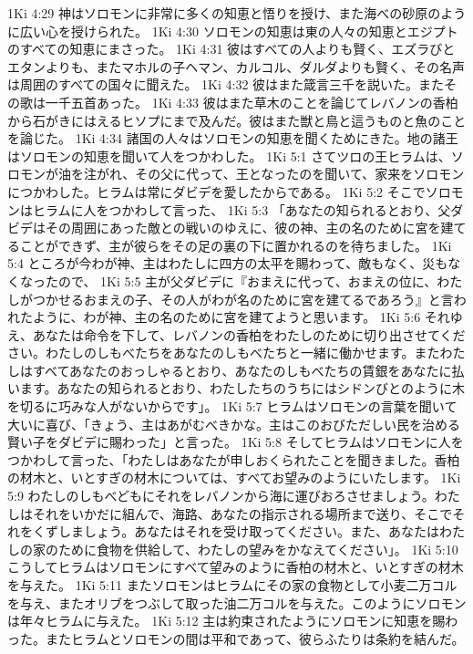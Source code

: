 1Ki 4:29  神はソロモンに非常に多くの知恵と悟りを授け、また海べの砂原のように広い心を授けられた。
1Ki 4:30  ソロモンの知恵は東の人々の知恵とエジプトのすべての知恵にまさった。
1Ki 4:31  彼はすべての人よりも賢く、エズラびとエタンよりも、またマホルの子ヘマン、カルコル、ダルダよりも賢く、その名声は周囲のすべての国々に聞えた。
1Ki 4:32  彼はまた箴言三千を説いた。またその歌は一千五首あった。
1Ki 4:33  彼はまた草木のことを論じてレバノンの香柏から石がきにはえるヒソプにまで及んだ。彼はまた獣と鳥と這うものと魚のことを論じた。
1Ki 4:34  諸国の人々はソロモンの知恵を聞くためにきた。地の諸王はソロモンの知恵を聞いて人をつかわした。
1Ki 5:1  さてツロの王ヒラムは、ソロモンが油を注がれ、その父に代って、王となったのを聞いて、家来をソロモンにつかわした。ヒラムは常にダビデを愛したからである。
1Ki 5:2  そこでソロモンはヒラムに人をつかわして言った、
1Ki 5:3  「あなたの知られるとおり、父ダビデはその周囲にあった敵との戦いのゆえに、彼の神、主の名のために宮を建てることができず、主が彼らをその足の裏の下に置かれるのを待ちました。
1Ki 5:4  ところが今わが神、主はわたしに四方の太平を賜わって、敵もなく、災もなくなったので、
1Ki 5:5  主が父ダビデに『おまえに代って、おまえの位に、わたしがつかせるおまえの子、その人がわが名のために宮を建てるであろう』と言われたように、わが神、主の名のために宮を建てようと思います。
1Ki 5:6  それゆえ、あなたは命令を下して、レバノンの香柏をわたしのために切り出させてください。わたしのしもべたちをあなたのしもべたちと一緒に働かせます。またわたしはすべてあなたのおっしゃるとおり、あなたのしもべたちの賃銀をあなたに払います。あなたの知られるとおり、わたしたちのうちにはシドンびとのように木を切るに巧みな人がないからです」。
1Ki 5:7  ヒラムはソロモンの言葉を聞いて大いに喜び、「きょう、主はあがむべきかな。主はこのおびただしい民を治める賢い子をダビデに賜わった」と言った。
1Ki 5:8  そしてヒラムはソロモンに人をつかわして言った、「わたしはあなたが申しおくられたことを聞きました。香柏の材木と、いとすぎの材木については、すべてお望みのようにいたします。
1Ki 5:9  わたしのしもべどもにそれをレバノンから海に運びおろさせましょう。わたしはそれをいかだに組んで、海路、あなたの指示される場所まで送り、そこでそれをくずしましょう。あなたはそれを受け取ってください。また、あなたはわたしの家のために食物を供給して、わたしの望みをかなえてください」。
1Ki 5:10  こうしてヒラムはソロモンにすべて望みのように香柏の材木と、いとすぎの材木を与えた。
1Ki 5:11  またソロモンはヒラムにその家の食物として小麦二万コルを与え、またオリブをつぶして取った油二万コルを与えた。このようにソロモンは年々ヒラムに与えた。
1Ki 5:12  主は約束されたようにソロモンに知恵を賜わった。またヒラムとソロモンの間は平和であって、彼らふたりは条約を結んだ。
